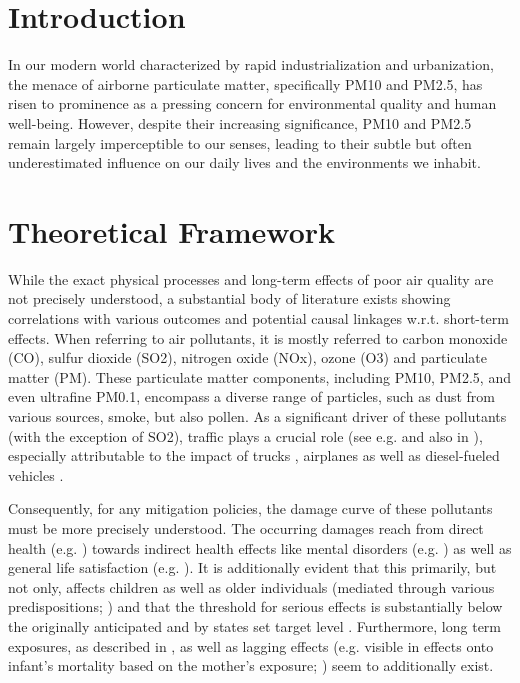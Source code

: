 \documentclass[12pt,a4paper]{article}
\begin{document}
\thispagestyle{plain}
\tableofcontents
\clearpage
{}
\listoftables
{}
\listoffigures
\pagebreak
{}
\section{Introduction}
In our modern world characterized by rapid industrialization and urbanization, the menace of airborne particulate matter, specifically PM10 and PM2.5, has risen to prominence as a pressing concern for environmental quality and human well-being. However, despite their increasing significance, PM10 and PM2.5 remain largely imperceptible to our senses, leading to their subtle but often underestimated influence on our daily lives and the environments we inhabit.
\clearpage
\section{Theoretical Framework}
While the exact physical processes and long-term effects of poor air quality are not precisely understood, a substantial body of literature exists showing correlations with various outcomes and potential causal linkages w.r.t. short-term effects. When referring to air pollutants, it is mostly referred to carbon monoxide (CO), sulfur dioxide (SO2), nitrogen oxide (NOx), ozone (O3) and particulate matter (PM). These particulate matter components, including PM10, PM2.5, and even ultrafine PM0.1, encompass a diverse range of particles, such as dust from various sources, smoke, but also pollen. As a significant driver of these pollutants (with the exception of SO2), traffic plays a crucial role (see e.g. \citealp{thorpe2008,costa2017,zhong2017} and also in \citealp{bauernschuster2017}), especially attributable to the impact of trucks \citep{lena2002}, airplanes \citep{schlenker2016} as well as diesel-fueled vehicles \citep{kinney2000}.

Consequently, for any mitigation policies, the damage curve of these pollutants must be more precisely understood. The occurring damages reach from direct health (e.g. \citealp{schlenker2016,kampa2008,chen2021}) towards indirect health effects like mental disorders (e.g. \citealp{pedersen2004,szyszkowicz2007,zhang2017}) as well as general life satisfaction (e.g. \citealp{mackerron2009,rehdanz2008,szyszkowicz2007}).  It is additionally evident that this primarily, but not only, affects children \citep{beatty2014} as well as older individuals (mediated through various predispositions; \citealp{peled2011}) and that the threshold for serious effects is substantially below the originally anticipated and by states set target level \citep{beelen2014}. Furthermore, long term exposures, as described in \citet{beelen2014}, as well as lagging effects (e.g. visible in effects onto infant's mortality based on the mother's exposure; \citealp{chay2003}) seem to additionally exist.
\end{document}
